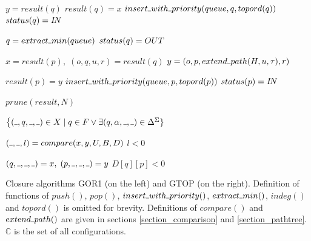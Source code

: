 \documentclass[AMA,STIX1COL]{WileyNJD-v2}
\newcommand{\Xund}{\rule{.4em}{.4pt}}
\newcommand{\YC}{\mathbb{C}}
\begin{document}
\begin{algorithm}[]
\begin{multicols}{2}
{        \BlankLine
        \For {$x = (\Xund, q, \Xund, \Xund) \in X$} {
            $y = result(q)$ \;
             {
                $result(q) = x$ \;
                 {
                    $insert \Xund with \Xund priority(queue, q, topord(q))$ \;
                    $status(q) = I\!N$ \;
                }
            }
        }

        \BlankLine
         {

            $q = extract \Xund min(queue)$ \;
            $status(q) = OUT$ \;

            \BlankLine
             {
                $x = result(p), \; (o, q, u, r) = result(q)$ \;
                $y = (o, p, extend \Xund path (H, u, \tau), r)$ \;

                \BlankLine
                 {
                    $result(p) = y$ \;
                     {
                        $insert \Xund with \Xund priority(queue, p, topord(p))$ \;
                        $status(p) = I\!N$ \;
                    }
                }
            }
        }

        \BlankLine
        \Return $prune(result, N)$
    }
    \BlankLine
    \BlankLine

     {
        \Return $\big\{ (\Xund, q, \Xund, \Xund) \in X \mid
            q \in F \vee \exists (q, \alpha, \Xund, \Xund) \in \Delta^\Sigma \}$
    }
    \BlankLine
    \BlankLine

     {
        $(\Xund, \Xund, l) = compare (x, y, U, B, D)$ \;
        \Return $l < 0$
    }
    \BlankLine
    \BlankLine

     {
        $(q, \Xund, \Xund, \Xund) = x, \; (p, \Xund, \Xund, \Xund) = y$ \;
        \Return $D[q][p] < 0$
    }
    \BlankLine
    \BlankLine

\end{multicols}
\vspace{1em}
\caption{
Closure algorithms GOR1 (on the left) and GTOP (on the right).
Definition of functions of $push()$, $pop()$, $insert \Xund with \Xund priority()$, $extract \Xund min()$,
$indeg()$ and $topord()$ is omitted for brevity.
Definitions of $compare ()$ and $extend \Xund path ()$ are given in sections \ref{section_comparison} and \ref{section_pathtree}.
$\YC$ is the set of all configurations.}
\end{algorithm}
\end{document}
